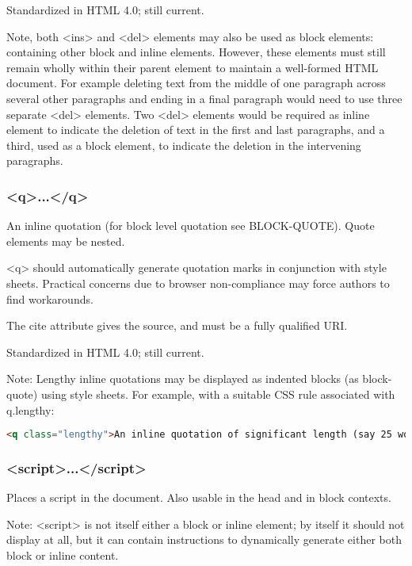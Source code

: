 Standardized in HTML 4.0; still current.

Note, both <ins> and <del> elements may also be used as block elements: containing other block and inline elements. However, these elements must still remain wholly within their parent element to maintain a well-formed HTML document. For example deleting text from the middle of one paragraph across several other paragraphs and ending in a final paragraph would need to use three separate <del> elements. Two <del> elements would be required as inline element to indicate the deletion of text in the first and last paragraphs, and a third, used as a block element, to indicate the deletion in the intervening paragraphs.


\subsubsection{<q>...</q>}


An inline quotation (for block level quotation see BLOCK-QUOTE). Quote elements may be nested.

<q> should automatically generate quotation marks in conjunction with style sheets. Practical concerns due to browser non-compliance may force authors to find workarounds.

The cite attribute gives the source, and must be a fully qualified URI.

Standardized in HTML 4.0; still current.

Note: Lengthy inline quotations may be displayed as indented blocks (as block-quote) using style sheets. For example, with a suitable CSS rule associated with q.lengthy:

\begin{lstlisting}[language=HTML]
<q class="lengthy">An inline quotation of significant length (say 25 words, for example) goes here...</q>
\end{lstlisting}


\subsubsection{<script>...</script>}

Places a script in the document. Also usable in the head and in block contexts.

Note: <script> is not itself either a block or inline element; by itself it should not display at all, but it can contain instructions to dynamically generate either both block or inline content.

